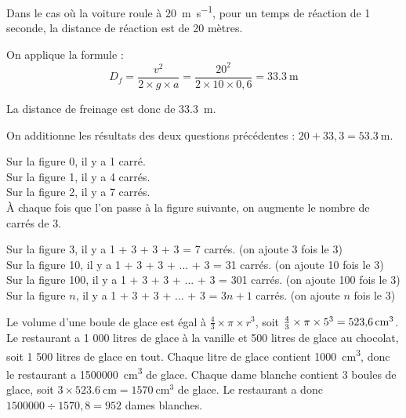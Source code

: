 \documentclass[../Cours.tex]{subfiles}
\begin{document}
\clearpage
\thispagestyle{empty}
\color{black}

\titreDScorrection

\begin{questions}
\EXERCICE{}

\question Dans le cas où la voiture roule à \qty{20}{\metre\per\second}, pour un temps de réaction de 1 seconde, la distance de réaction est de 20 mètres.

\question On applique la formule :
$$D_f = \frac{v^2}{2 \times g \times a} = \frac{20^2}{2 \times 10 \times 0,6} = \qty{33,3}{\metre} $$

La distance de freinage est donc de \qty{33,3}{\metre}.

\question On additionne les résultats des deux questions précédentes : $20 + 33,3 = \qty{53,3}{\metre}$.

\EXERCICE{}

Sur la figure 0, il y a 1 carré.\\
Sur la figure 1, il y a 4 carrés.\\
Sur la figure 2, il y a 7 carrés.\\

À chaque fois que l'on passe à la figure suivante, on augmente le nombre de carrés de 3.

Sur la figure 3, il y a 1 + 3 + 3 + 3 = 7 carrés. (on ajoute 3 fois le 3)\\
Sur la figure 10, il y a 1 + 3 + 3 + ... + 3 = 31 carrés. (on ajoute 10 fois le 3)\\
Sur la figure 100, il y a 1 + 3 + 3 + ... + 3 = 301 carrés. (on ajoute 100 fois le 3)\\
Sur la figure $n$, il y a 1 + 3 + 3 + ... + 3 = $3n+1$ carrés. (on ajoute $n$ fois le 3)

\EXERCICE{}

Le volume d'une boule de glace est égal à $\frac{4}{3} \times \pi \times r^3$, soit $\frac{4}{3} \times \pi \times 5^3 = \qty{523.6}{cm\cubed}$. Le restaurant a 1 000 litres de glace à la vanille et 500 litres de glace au chocolat, soit 1 500 litres de glace en tout. Chaque litre de glace contient \qty{1000}{\centi\metre\cubed}, donc le restaurant a \qty{1500000}{\centi\metre\cubed} de glace. Chaque dame blanche contient 3 boules de glace, soit $3 \times \qty{523,6}{\centi\metre} = \qty{1570}{\centi\metre\cubed}$ de glace. Le restaurant a donc $1 500 000 \div 1570,8 = 952$ dames blanches.

\clearpage
{}

\begin{center}
\end{center}


\end{questions}
\end{document}
